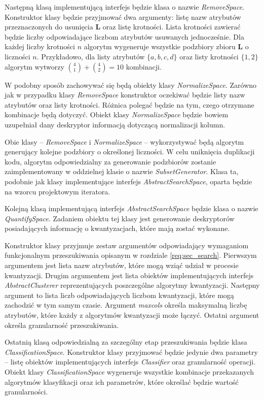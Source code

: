 \documentclass[../thesis.tex]{subfiles}
\begin{document}
Następną klasą implementującą interfejs będzie klasa o nazwie \emph{RemoveSpace}. Konstruktor klasy będzie przyjmować dwa argumenty: listę nazw atrybutów przeznaczonych do usunięcia $\textbf{L}$ oraz listę krotności. Lista krotności zawierać będzie liczby odpowiadające liczbom atrybutów usuwanych jednocześnie. Dla każdej liczby krotności $n$ algorytm wygeneruje wszystkie podzbiory zbioru $\textbf{L}$ o liczności $n$. Przykładowo, dla listy atrybutów $\{a, b, c, d\}$ oraz listy krotności $\{1, 2\}$ algorytm wytworzy ${4 \choose 1} + {4 \choose 2} = 10$ kombinacji.  

W podobny sposób zachowywać się będą obiekty klasy \emph{NormalizeSpace}. Zarówno jak w przypadku klasy \emph{RemoveSpace} konstruktor oczekiwać będzie listy nazw atrybutów oraz listy krotności. Różnica polegać będzie na tym, czego otrzymane kombinacje będą dotyczyć. Obiekt klasy \emph{NormalizeSpace} będzie bowiem uzupełniał dany deskryptor informacją dotyczącą normalizacji kolumn. 

Obie klasy -- \emph{RemoveSpace} i \emph{NormalizeSpace} -- wykorzystywać będą algorytm generujący kolejne podzbiory o określonej liczności. W celu uniknięcia duplikacji kodu, algorytm odpowiedzialny za generowanie podzbiorów zostanie zaimplementowany w oddzielnej klasie o nazwie \emph{SubsetGenerator}. Klasa ta, podobnie jak klasy implementujące interfejs \emph{AbstractSearchSpace}, oparta będzie na wzorcu projektowym iteratora. 

Kolejną klasą implementującą interfejs \emph{AbstractSearchSpace} będzie klasa o nazwie \emph{QuantifySpace}. Zadaniem obiektu tej klasy jest generowanie deskryptorów posiadających informację o kwantyzacjach, które mają zostać wykonane. 

Konstruktor klasy przyjmuje zestaw argumentów odpowiadający wymaganiom funkcjonalnym przeszukiwania opisanym w rozdziale \ref{req:sec_search}. Pierwszym argumentem jest lista nazw atrybutów, które mogą wziąć udział w procesie kwantyzacji. Drugim argumentem jest lista obiektów implementujących interfejs \emph{AbstractClusterer} reprezentujących poszczególne algorytmy kwantyzacji. Następny argument to lista liczb odpowiadających liczbom kwantyzacji, które mogą zachodzić w tym samym czasie. Argument \emph{max\textunderscore cols} określa maksymalną liczbę atrybutów, które każdy z algorytmów kwantyzacji może łączyć. Ostatni argument określa granularność przeszukiwania.

Ostatnią klasą odpowiedzialną za szczególny etap przeszukiwania będzie klasa \emph{ClassificationSpace}. Konstruktor klasy przyjmować będzie jedynie dwa parametry -- listę obiektów implementujących interfejs \emph{Classifier} oraz granularność operacji. Obiekt klasy \emph{ClassificationSpace} wygeneruje wszystkie kombinacje przekazanych algorytmów klasyfikacji oraz ich parametrów, które określać będzie wartość granularności.
\end{document}
